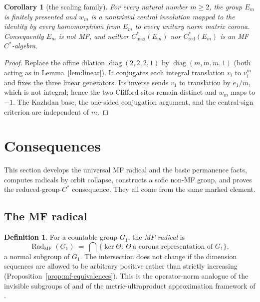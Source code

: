 \documentclass[11pt]{amsart}
\newcommand{\leanverified}[2]{\ignorespaces}
\newtheorem{corollary}[theorem]{Corollary}
\theoremstyle{definition}
\newtheorem{definition}[theorem]{Definition}
\theoremstyle{remark}
\theoremstyle{plain}
\newcommand{\Cmax}{C^*_{\mathrm{max}}}
\newcommand{\Cred}{C^*_{\mathrm{red}}}
\begin{document}
\begin{corollary}[the scaling family]\label{cor:scaling-family}
For every natural number $m\ge2$, the group $E_m$ is finitely presented and
$w_m$ is a nontrivial central involution mapped to the identity by every
homomorphism from $E_m$ to every unitary norm matrix corona.  Consequently $E_m$ is not MF,
and neither $\Cmax(E_m)$ nor $\Cred(E_m)$ is an MF $C^*$-algebra.
\leanverified{Sofic/ScalingFamilyEndpoint}{GroupApproximation.ScalingFamilyEndpoint.manuscriptTheoremFamily}
\end{corollary}

\begin{proof}
Replace the affine dilation $\operatorname{diag}(2,2,2,1)$ by
$\operatorname{diag}(m,m,m,1)$ (both acting as in
Lemma~\ref{lem:linear}).  It conjugates each integral translation
$v_i$ to $v_i^m$ and fixes the three linear generators.  Its inverse sends
$v_1$ to translation by $e_1/m$, which is not integral; hence the two
Clifford sites remain distinct and $w_m$ maps to $-1$.  The Kazhdan base,
the one-sided conjugation argument, and the central-sign criterion are
independent of $m$.
\end{proof}

\section{Consequences}\label{sec:consequences}

This section develops the universal MF radical and the basic
permanence facts, computes radicals by orbit collapse, constructs a
sofic non-MF group, and proves the reduced-group-$C^*$ consequence.
They all come from the same marked element.

\subsection{The MF radical}

\begin{definition}\label{def:radical}
For a countable group $G_1$, the \emph{MF radical} is
\[
  \operatorname{Rad}_{\mathrm{MF}}(G_1)
  \;=\;\bigcap\,\bigl\{\ker\Theta:\ \Theta\ \text{a corona
  representation of }G_1\bigr\},
\]
a normal subgroup of $G_1$.  The intersection does not change if the
dimension sequences are allowed to be arbitrary positive rather than
strictly increasing (Proposition~\ref{prop:mf-equivalences}).  This is the
operator-norm analogue of
the invisible subgroups of \cite[Definitions~2.5--2.7]{SlofstraCorrelations}
and of the metric-ultraproduct approximation framework of \cite{NST}.
\leanverified{Sofic/ManuscriptExactWrappers}{GroupApproximation.ManuscriptExactWrappers.manuscriptMFRadical}
\end{definition}
\end{document}
